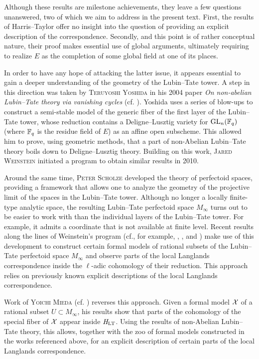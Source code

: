 \documentclass[../main.tex]{subfiles}
\begin{document}
Although these results are milestone achievements, they leave a few questions
unanswered, two of which we aim to address in the present text. 
First, the results of Harris--Taylor offer no insight into the question of
providing an explicit description of the correspondence.
Secondly, and this point is of rather conceptual nature, their proof makes
essential use of global arguments, ultimately requiring to realize $E$ as the
completion of some global field at one of its places.

In order to have any hope of attacking the latter issue, it appears essential
to gain a deeper understanding of the geometry of the Lubin--Tate tower. 
A step in this direction was taken by \textsc{Teruyoshi Yoshida} in his
2004 paper \textit{On non-abelian Lubin--Tate theory via vanishing cycles}
(cf. \cite{yoshida2010non}).
Yoshida uses a series of blow-ups to construct a
semi-stable model of the generic fiber of the first layer of the Lubin--Tate tower,
whose reduction contains a Deligne--Lusztig variety for $\operatorname{GL}_n(\mathbb{F}_q)$ (where
$\mathbb{F}_q$ is the residue field of $E$) as an affine open subscheme. This allowed
him to prove, using geometric methods, that a part of non-Abelian Lubin--Tate theory
boils down to Deligne--Lusztig theory. 
Building on this work, \textsc{Jared Weinstein} initiated a program
to obtain similar results in 2010. 

Around the same time, \textsc{Peter Scholze} developed the theory of perfectoid spaces,
providing a framework that allows one to analyze the geometry of the projective limit
of the spaces in the Lubin--Tate tower. 
Although no longer a locally finite-type analytic space, the resulting
Lubin--Tate perfectoid space $M_\infty$ turns out to be easier to work with than
the individual layers of the Lubin--Tate tower. For example, it admits a
coordinate that is not available at finite level.
Recent results along the lines of Weinstein's program
(cf., for example, \cite{weinstein2016semistable},
\cite{BoyarchenkoWeinstein2011MaxVar}, \cite{imaitsushima2020affinoids} and
\cite{tokimoto2020affinoids}) make use of this development to construct
certain formal models of rational subsets of the Lubin--Tate perfectoid space
$M_{\infty}$ and observe parts of the local Langlands correspondence
inside the $\ell$-adic cohomology of their reduction. This approach relies on
previously known explicit descriptions of the local Langlands
correspondence.

Work of \textsc{Yoichi Mieda} (cf. \cite{mieda2016geometric}) reverses this
approach. Given a formal model $\mathcal{X}$ of a rational subset $U \subset M_\infty$,
his results show that parts of the cohomology of the
special fiber of $\mathcal{X}$ appear inside $\mathit H_{\mathrm{LT}}$. Using the results of non-Abelian
Lubin--Tate theory, this allows, together with the zoo of formal models
constructed in the works referenced above, for an explicit description of
certain parts of the local Langlands correspondence.
\end{document}
